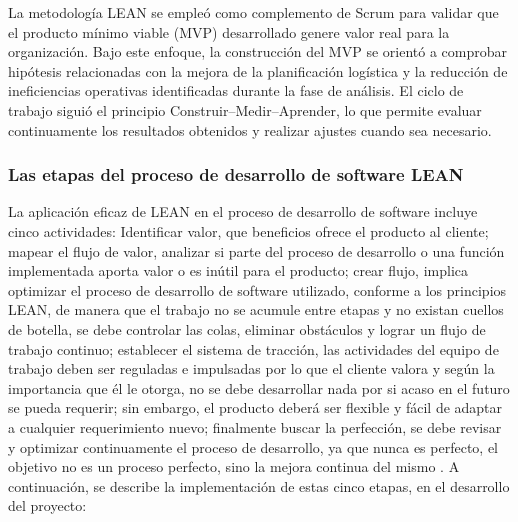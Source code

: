 La metodología LEAN se empleó como complemento de Scrum para validar que el producto mínimo viable (MVP) desarrollado genere valor real para la organización. Bajo este enfoque, la construcción del MVP se orientó a comprobar hipótesis relacionadas con la mejora de la planificación logística y la reducción de ineficiencias operativas identificadas durante la fase de análisis. El ciclo de trabajo siguió el principio Construir--Medir--Aprender, lo que permite evaluar continuamente los resultados obtenidos y realizar ajustes cuando sea necesario.

\subsubsection{Las etapas del proceso de desarrollo de software LEAN}\label{las-etapas-del-proceso-de-desarrollo-de-software-lean}

La aplicación eficaz de LEAN en el proceso de desarrollo de software incluye cinco actividades: Identificar valor, que beneficios ofrece el producto al cliente; mapear el flujo de valor, analizar si parte del proceso de desarrollo o una función implementada aporta valor o es inútil para el producto; crear flujo, implica optimizar el proceso de desarrollo de software utilizado, conforme a los principios LEAN, de manera que el trabajo no se acumule entre etapas y no existan cuellos de botella, se debe controlar las colas, eliminar obstáculos y lograr un flujo de trabajo continuo; establecer el sistema de tracción, las actividades del equipo de trabajo deben ser reguladas e impulsadas por lo que el cliente valora y según la importancia que él le otorga, no se debe desarrollar nada por si acaso en el futuro se pueda requerir; sin embargo, el producto deberá ser flexible y fácil de adaptar a cualquier requerimiento nuevo; finalmente buscar la perfección, se debe revisar y optimizar continuamente el proceso de desarrollo, ya que nunca es perfecto, el objetivo no es un proceso perfecto, sino la mejora continua del mismo \citep{paladiy2026}. A continuación, se describe la implementación de estas cinco etapas, en el desarrollo del proyecto:

